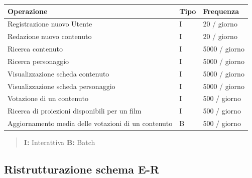 \documentclass[a4paper]{article}
\begin{document}
\begin{tabular}{ | L{0.63\textwidth} | L{0.13\textwidth} | L{0.23\textwidth} | }

\hline
\textbf{Operazione} & \textbf{Tipo} & \textbf{Frequenza} \\

\hline
\hline
Registrazione nuovo Utente & I & 20 / giorno \\

\hline
Redazione nuovo contenuto & I & 20 / giorno \\

\hline
Ricerca contenuto & I & 5000 / giorno \\

\hline
Ricerca personaggio & I & 5000 / giorno \\

\hline
Visualizzazione scheda contenuto & I & 5000 / giorno \\

\hline
Visualizzazione scheda personaggio & I & 5000 / giorno \\

\hline
Votazione di un contenuto & I & 500 / giorno \\

\hline
Ricerca di proiezioni disponibili per un film & I & 500 / giorno \\ 

\hline
Aggiornamento media delle votazioni di un contenuto & B & 500 / giorno \\ 

\hline

\end{tabular}

\begin{quotation}\footnotesize
\textbf{I:} Interattiva \quad \textbf{B:} Batch
\end{quotation}

\subsection{Ristrutturazione schema E-R}
\end{document}

